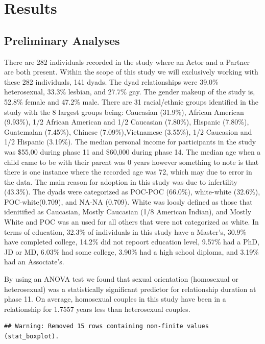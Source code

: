 \documentclass[man]{apa6}
\begin{document}
\hypertarget{results}{%
\section{Results}\label{results}}

\hypertarget{preliminary-analyses}{%
\subsection{Preliminary Analyses}\label{preliminary-analyses}}

There are 282 individuals recorded in the study where an Actor and a Partner are both present. Within the scope of this study we will exclusively working with these 282 individuals, 141 dyads.
The dyad relationships were 39.0\% heterosexual, 33.3\% lesbian, and 27.7\% gay.
The gender makeup of the study is, 52.8\% female and 47.2\% male.
There are 31 racial/ethnic groups identified in the study with the 8 largest groups being: Caucasian (31.9\%), African American (9.93\%), 1/2 African American and 1/2 Caucasian (7.80\%), Hispanic (7.80\%), Guatemalan (7.45\%), Chinese (7.09\%),Vietnamese (3.55\%), 1/2 Caucasion and 1/2 Hispanic (3.19\%).
The median personal income for participants in the study was \$55,00 during phase 11 and \$60,000 during phase 14.
The median age when a child came to be with their parent was 0 years however something to note is that there is one instance where the recorded age was 72, which may due to error in the data.
The main reason for adoption in this study was due to infertility (43.3\%).
The dyads were categorized as POC-POC (66.0\%), white-white (32.6\%), POC-white(0.709), and NA-NA (0.709). White was loosly defined as those that idenitified as Caucasian, Mostly Caucasian (1/8 American Indian), and Mostly White and POC was an used for all others that were not categorized as white.
In terms of education, 32.3\% of individuals in this study have a Master's, 30.9\% have completed college, 14.2\% did not repoort education level, 9.57\% had a PhD, JD or MD, 6.03\% had some college, 3.90\% had a high school diploma, and 3.19\% had an Associate's.

By using an ANOVA test we found that sexual orientation (homosexual or heterosexual) was a statistically significant predictor for relationship duration at phase 11. On average, homosexual couples in this study have been in a relationship for 1.7557 years less than heterosexual couples.

\begin{verbatim}
## Warning: Removed 15 rows containing non-finite values (stat_boxplot).
\end{verbatim}
\end{document}
